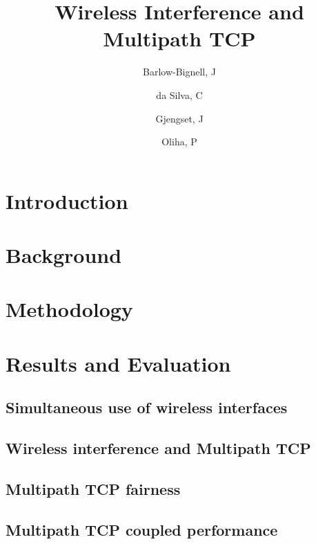 \documentclass[12pt,a4paper]{article}
\title{Wireless Interference and Multipath TCP}
\author{Barlow-Bignell, J}
\author{da Silva, C}
\author{Gjengset, J}
\author{Oliha, P}
\affil{University College London}
\date{}
\begin{document}
\maketitle

\begin{abstract}

\end{abstract}
\clearpage

\tableofcontents

\section{Introduction}

\FloatBarrier

\section{Background}

\FloatBarrier

\section{Methodology}

\FloatBarrier

\section{Results and Evaluation}

\subsection{Simultaneous use of wireless interfaces}
\label{sec:results-interference}

\FloatBarrier
\subsection{Wireless interference and Multipath TCP}
\label{sec:results-mptcp}

\FloatBarrier
\subsection{Multipath TCP fairness}
\label{sec:results-fairness}

\FloatBarrier
\subsection{Multipath TCP coupled performance}
\label{sec:results-performance}

\FloatBarrier
\end{document}
